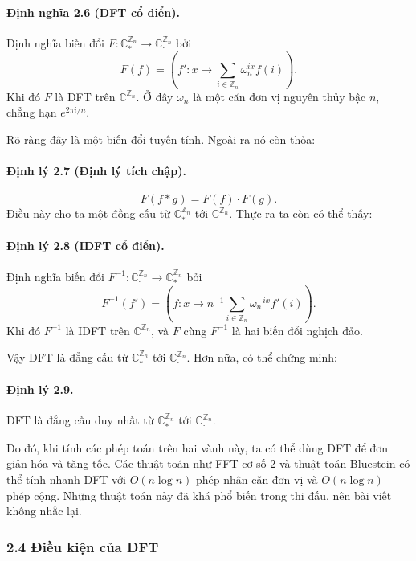 \documentclass[11pt]{article}
\begin{document}
\paragraph{Định nghĩa 2.6 (DFT cổ điển).}
Định nghĩa biến đổi \(F:\mathbb C^{\mathbb Z_n}_*\to
\mathbb C^{\mathbb Z_n}_{\cdot}\) bởi
\[
  F(f)=\left(f':x\mapsto \sum_{i\in\mathbb Z_n}\omega_n^{ix}f(i)\right).
\]
Khi đó \(F\) là DFT trên \(\mathbb C^{\mathbb Z_n}\). Ở đây \(\omega_n\) là một
căn đơn vị nguyên thủy bậc \(n\), chẳng hạn \(e^{2\pi i/n}\).

Rõ ràng đây là một biến đổi tuyến tính. Ngoài ra nó còn thỏa:

\paragraph{Định lý 2.7 (Định lý tích chập).}
\[
  F(f*g)=F(f)\cdot F(g).
\]
Điều này cho ta một đồng cấu từ \(\mathbb C^{\mathbb Z_n}_*\) tới
\(\mathbb C^{\mathbb Z_n}_{\cdot}\). Thực ra ta còn có thể thấy:

\paragraph{Định lý 2.8 (IDFT cổ điển).}
Định nghĩa biến đổi \(F^{-1}:\mathbb C^{\mathbb Z_n}_{\cdot}\to
\mathbb C^{\mathbb Z_n}_*\) bởi
\[
  F^{-1}(f')=
  \left(f:x\mapsto n^{-1}\sum_{i\in\mathbb Z_n}\omega_n^{-ix}f'(i)\right).
\]
Khi đó \(F^{-1}\) là IDFT trên \(\mathbb C^{\mathbb Z_n}\), và \(F\) cùng
\(F^{-1}\) là hai biến đổi nghịch đảo.

Vậy DFT là đẳng cấu từ \(\mathbb C^{\mathbb Z_n}_*\) tới
\(\mathbb C^{\mathbb Z_n}_{\cdot}\). Hơn nữa, có thể chứng minh:

\paragraph{Định lý 2.9.}
DFT là đẳng cấu duy nhất từ \(\mathbb C^{\mathbb Z_n}_*\) tới
\(\mathbb C^{\mathbb Z_n}_{\cdot}\).

Do đó, khi tính các phép toán trên hai vành này, ta có thể dùng DFT để đơn giản
hóa và tăng tốc. Các thuật toán như FFT cơ số 2 và thuật toán Bluestein có thể
tính nhanh DFT với \(O(n\log n)\) phép nhân căn đơn vị và \(O(n\log n)\) phép
cộng. Những thuật toán này đã khá phổ biến trong thi đấu, nên bài viết không
nhắc lại.

\subsubsection*{2.4 Điều kiện của DFT}
\end{document}
